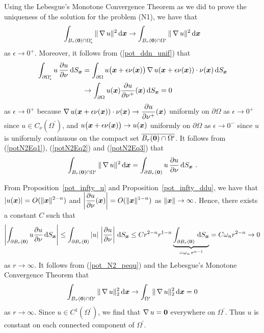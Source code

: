 Using the Lebesgue's Monotone Convergence Theorem as we did to prove
the uniqueness of the solution for the problem (N1), we have that
\begin{equation} \label{potN2Eq2}
\int_{B_r({\bm{0}})\cap\Omega^{\prime}_\epsilon} \| \operatorname{\nabla} u \|^2 \,\mathrm{d}{{\bm{x}}}
\rightarrow \int_{B_r({\bm{0}})\cap\Omega^{\prime}} \| \operatorname{\nabla} u \|^2 \,\mathrm{d}{{\bm{x}}}
\end{equation}
as $\epsilon \rightarrow 0^+$.
Moreover, it follows from (\ref{pot_ddn_unif}) that
\begin{equation} \label{potN2Eq3}
\begin{split}
\int_{\partial \Omega^{\prime}_\epsilon} u\,\frac{\partial{u}}{\partial \nu} \,\mathrm{d}{S}_{{\bm{x}}}
&= \int_{\partial \Omega} u\big({\bm{x}} + \epsilon \nu({\bm{x}})\big)
\operatorname{\nabla} u({\bm{x}} + \epsilon \nu({\bm{x}})) \cdot
\nu({\bm{x}}) \,\mathrm{d}{S}_{{\bm{x}}} \\
&\rightarrow \int_{\partial \Omega} u({\bm{x}}) \frac{\partial{u}}{\partial \nu^+}({\bm{x}})
\,\mathrm{d}{S}_{{\bm{x}}} = 0
\end{split}
\end{equation}
as $\epsilon \rightarrow 0^+$ because
$\displaystyle
\operatorname{\nabla} u({\bm{x}} + \epsilon \nu({\bm{x}})) \cdot \nu({\bm{x}})
\to \frac{\partial{u}}{\partial \nu^+}({\bm{x}})$ uniformly on $\partial \Omega$ as
$\epsilon \to 0^+$ since
$\displaystyle u \in C_{\nu}(\Omega^{\prime})$, and
$\displaystyle u\big({\bm{x}} + \epsilon \nu({\bm{x}})\big) \to
u({\bm{x}})$ uniformly on $\partial \Omega$ as $\epsilon \to 0^-$
since $u$ is uniformly continuous on the compact set
$\displaystyle\overline{B_r({\bm{0}})\cap\Omega^{\prime}}$.
It follows from (\ref{potN2Eq1}), (\ref{potN2Eq2}) and
(\ref{potN2Eq3}) that 
\begin{equation} \label{pot_N2_pequ}
\int_{B_r({\bm{0}})\cap\Omega^{\prime}} \| \operatorname{\nabla} u \|^2 \,\mathrm{d}{{\bm{x}}} =
\int_{\partial B_r({\bm{0}})} u\,\frac{\partial{u}}{\partial \nu} \,\mathrm{d}{S}_{{\bm{x}}} \  .
\end{equation}

 From Proposition~\ref{pot_infty_u} and
Proposition~\ref{pot_infty_ddu}, we have that
$\displaystyle |u({\bm{x}})| = O(\|{\bm{x}}\|^{2-n})$ and
$\displaystyle \left| \frac{\partial{u}}{\partial \nu}({\bm{x}})\right|
= O(\|{\bm{x}}\|^{1-n})$ as $\|{\bm{x}}\|\rightarrow \infty$.  Hence,
there exists a constant $C$ such that
\[
\left| \int_{\partial B_r({\bm{0}})} u \frac{\partial{u}}{\partial \nu} \,\mathrm{d}{S}_{{\bm{x}}}
\right| \leq
\int_{\partial B_r({\bm{0}})} \left| u \right|\,\left| \frac{\partial{u}}{\partial \nu} \right|
\,\mathrm{d}{S}_{{\bm{x}}}
\leq C r^{2-n} r^{1-n}
\underbrace{\int_{\partial B_r({\bm{0}})} \,\mathrm{d}{S}_{{\bm{x}}}}_{=\omega_n \,r^{n-1}}
= C \omega_n r^{2-n} \rightarrow 0 
\]
as $r \rightarrow \infty$.
It follows from (\ref{pot_N2_pequ}) and the Lebesgue's Monotone
Convergence Theorem that
\[
\int_{B_r({\bm{0}})\cap\Omega^{\prime}} \| \operatorname{\nabla} u \|_2^2 \,\mathrm{d}{{\bm{x}}} \rightarrow
\int_{\Omega^{\prime}} \| \operatorname{\nabla} u \|_2^2 \,\mathrm{d}{{\bm{x}}} = 0
\]
as $r \rightarrow \infty$.
Since $\displaystyle u \in C^1(\Omega^{\prime})$, we find that
$\operatorname{\nabla} u = {\bm{0}}$ everywhere on $\displaystyle \Omega^{\prime}$.
Thus $u$ is constant on each connected component of $\Omega^{\prime}$.

